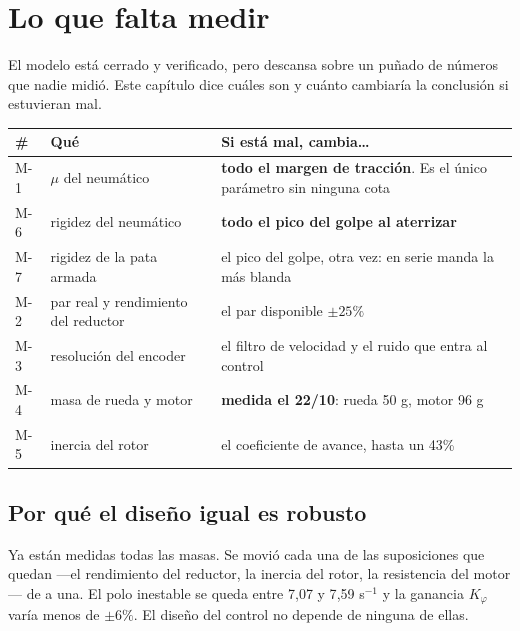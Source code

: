 \documentclass[11pt,a4paper]{report}
\begin{document}
\chapter{Lo que falta medir}\label{cap:falta}

\begin{idea}
El modelo está cerrado y verificado, pero descansa sobre un puñado de números que nadie midió.
Este capítulo dice cuáles son y cuánto cambiaría la conclusión si estuvieran mal.
\end{idea}

\begin{center}
\small
\begin{tabular}{@{}llp{7.0cm}@{}}
\toprule
\textbf{\#} & \textbf{Qué} & \textbf{Si está mal, cambia\ldots} \\
\midrule
M-1 & $\mu$ del neumático & \textbf{todo el margen de tracción}. Es el único parámetro
sin ninguna cota \\
M-6 & rigidez del neumático & \textbf{todo el pico del golpe al aterrizar} \\
M-7 & rigidez de la pata armada & el pico del golpe, otra vez: en serie manda la más blanda \\
M-2 & par real y rendimiento del reductor & el par disponible $\pm25\%$ \\
M-3 & resolución del encoder & el filtro de velocidad y el ruido que entra al control \\
M-4 & masa de rueda y motor & \textcolor{verdep}{\textbf{medida el 22/10}}: rueda 50 g, motor 96 g \\
M-5 & inercia del rotor & el coeficiente de avance, hasta un 43\% \\
\bottomrule
\end{tabular}
\end{center}

\section{Por qué el diseño igual es robusto}

Ya están medidas todas las masas. Se movió cada una de las suposiciones que quedan ---el
rendimiento del reductor, la inercia del rotor, la resistencia del motor--- de a una. El polo
inestable se queda entre 7{,}07 y 7{,}59 s$^{-1}$ y la ganancia $K_\varphi$ varía menos de
$\pm6\%$. El diseño del control no depende de ninguna de ellas.
\end{document}
